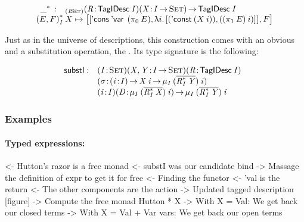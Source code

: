 \[\stk{
\begin{array}{ll}
\FreeIMonad{\_}{} : & _{\PITEL{\V{I}}{\Set}}
                     \PITEL{\V{R}}{\TagIDesc{\V{I}}} 
                     \PITEL{\V{X}}{\V{I} \To \Set}\To 
                      \TagIDesc{\V{I}}
\end{array} \\
\FreeIMonad{(E,F)}{I}{X} \mapsto
    \pair{\pair{\ListCons{\DVar{}}{(\fst{E})}} 
               {\LAM{i}
                \pair{(\DConst{(X\: i)})}
                     {((\snd{E})\: i)}{}}{}}
         {F}{}
}\]

Just as in the universe of descriptions, this construction comes with
an obvious \return and a substitution operation, the \bind. Its type
signature is the following:

\newcommand{\substI}{\F{substI}}

\[
\begin{array}{@{}ll}
\substI : & \PITEL{\V{I}}{\Set}
            \PITEL{\V{X}, \V{Y}}{\V{I} \To \Set}
            \PITEL{\V{R}}{\TagIDesc{\V{I}}} \\
          & \PITEL{\V{\sigma}}{\PI{\V{i}}{\V{I}} \V{X}\:\V{i} \To 
                               \IMu{\V{I}}{(\toIDesc{\FreeIMonad{\V{R}}{\V{I}}{\V{Y}}})}{\V{i}}} \\
          & \PITEL{\V{i}}{\V{I}}
            \PITEL{\V{D}}{\IMu{I}{(\toIDesc{\FreeIMonad{\V{R}}{\V{I}}{\V{X}}})}{\V{i}}} \To
            \IMu{I}{(\toIDesc{\FreeIMonad{\V{R}}{\V{I}}{\V{Y}}})}{\V{i}}
\end{array}
\]


\subsubsection{Examples}

\paragraph{Typed expressions:}

\begin{wstructure}
<- Hutton's razor is a free monad
    <- substI was our candidate bind
        -> Massage the definition of expr to get it for free
    <- Finding the functor
        <- 'val is the return
        <- The other components are the action
        -> Updated tagged description [figure]
    -> Compute the free monad Hutton * X
        -> With X = Val: We get back our closed terms
        -> With X = Val + Var vars: We get back our open terms
\end{wstructure}

